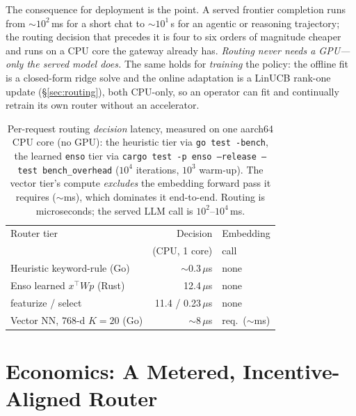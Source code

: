 \documentclass[11pt]{article}
\begin{document}
The consequence for deployment is the point. A served frontier completion runs from
$\sim$$10^{2}$\,ms for a short chat to $\sim$$10^{1}$\,s for an agentic or reasoning
trajectory; the routing decision that precedes it is four to six orders of magnitude
cheaper and runs on a CPU core the gateway already has. \emph{Routing never needs a
GPU---only the served model does.} The same holds for \emph{training} the policy:
the offline fit is a closed-form ridge solve and the online adaptation is a LinUCB
rank-one update (\S\ref{sec:routing}), both CPU-only, so an operator can fit and
continually retrain its own router without an accelerator.

\begin{table}[t]
\centering
\small
\setlength{\tabcolsep}{4.5pt}
\caption{Per-request routing \emph{decision} latency, measured on one aarch64 CPU
core (no GPU): the heuristic tier via \texttt{go test -bench}, the learned
\texttt{enso} tier via \texttt{cargo test -p enso --release --test bench\_overhead}
($10^{4}$ iterations, $10^{3}$ warm-up). The vector tier's compute \emph{excludes}
the embedding forward pass it requires ($\sim$ms), which dominates it end-to-end.
Routing is microseconds; the served LLM call is $10^{2}$--$10^{4}$\,ms.}
\label{tab:overhead}
\begin{tabular}{@{}lrl@{}}
\toprule
Router tier & Decision & Embedding \\
            & (CPU, 1 core) & call \\
\midrule
Heuristic keyword-rule (Go)        & $\sim$0.3\,$\mu$s   & none \\
Enso learned $x^{\top}Wp$ (Rust)   & 12.4\,$\mu$s        & none \\
\quad featurize / select           & 11.4 / 0.23\,$\mu$s & none \\
Vector NN, 768-d $K{=}20$ (Go)     & $\sim$8\,$\mu$s     & req.\ ($\sim$ms) \\
\bottomrule
\end{tabular}
\end{table}

\section{Economics: A Metered, Incentive-Aligned Router}
\label{sec:econ}
\end{document}
